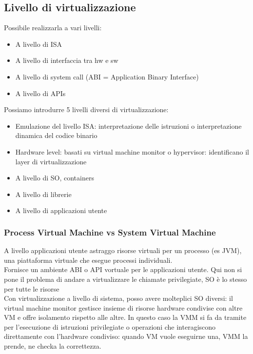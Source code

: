 \documentclass{article}
\begin{document}
\subsection{Livello di virtualizzazione}
Possibile realizzarla a vari livelli:
\begin{itemize}
\item A livello di ISA
\item A livello di interfaccia tra hw e sw
\item A livello di system call (ABI = Application Binary Interface)
\item A livello di APIs
\end{itemize}
Possiamo introdurre 5 livelli diversi di virtualizzazione:
\begin{itemize}
\item Emulazione del livello ISA: interpretazione delle istruzioni o interpretazione dinamica del codice binario
\item Hardware level: basati su virtual machine monitor o hypervisor: identificano il layer di virtualizzazione
\item A livello di SO, containers
\item A livello di librerie
\item A livello di applicazioni utente
\end{itemize}
\subsubsection{Process Virtual Machine vs System Virtual Machine}
A livello applicazioni utente astraggo risorse virtuali per un processo (es JVM), una piattaforma virtuale che esegue processi individuali.\\ Fornisce un ambiente ABI o API vortuale per le applicazioni utente. Qui non si pone il problema di andare a virtualizzare le chiamate privilegiate, SO è lo stesso per tutte le risorse\\ Con virtualizzazione a livello di sistema, posso avere molteplici SO diversi: il virtual machine monitor gestisce insieme di risorse hardware condivise con altre VM e offre isolamento rispetto alle altre. In questo caso la VMM si fa da tramite per l'esecuzione di istruzioni privilegiate o operazioni che interagiscono direttamente con l'hardware condiviso: quando VM vuole eseguirne una, VMM la prende, ne checka la correttezza.
\end{document}
